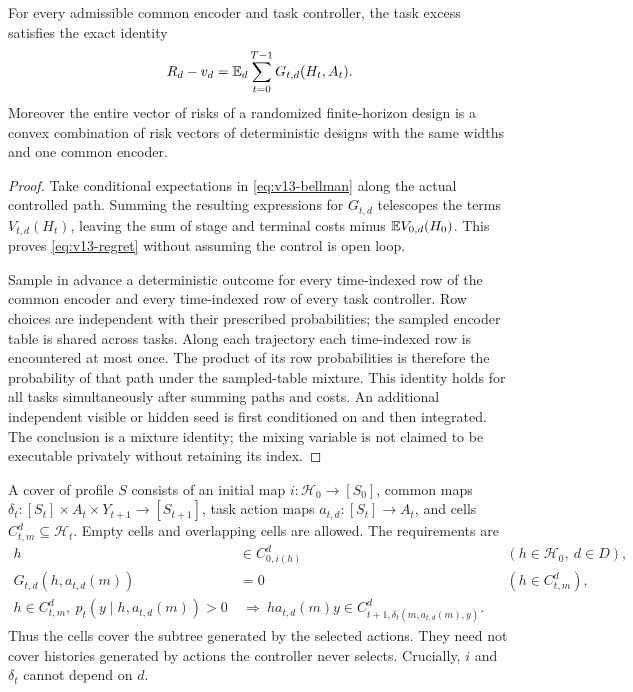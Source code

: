\begin{lemma}\label{lem:v13-regret}
For every admissible common encoder and task controller, the task excess
satisfies the exact identity
\begin{equation}\label{eq:v13-regret}
 R_d-v_d=\mathbb E_d\sum_{t=0}^{T-1}G_{t,d}(H_t,A_t).
\end{equation}
Moreover the entire vector of risks of a randomized finite-horizon
design is a convex combination of risk vectors of deterministic designs
with the same widths and one common encoder.
\end{lemma}
\begin{proof}
Take conditional expectations in \eqref{eq:v13-bellman} along the actual
controlled path. Summing the resulting expressions for $G_{t,d}$
telescopes the terms $V_{t,d}(H_t)$, leaving the sum of stage and terminal
costs minus $\mathbb E V_{0,d}(H_0)$. This proves \eqref{eq:v13-regret} without
assuming the control is open loop.

Sample in advance a deterministic outcome for every time-indexed row
of the common encoder and every time-indexed row of every task
controller. Row choices are independent with their prescribed
probabilities; the sampled encoder table is shared across tasks.
Along each trajectory each time-indexed row is encountered at most
once. The product of its row probabilities is therefore the probability
of that path under the sampled-table mixture. This identity holds for
all tasks simultaneously after summing paths and costs. An additional
independent visible or hidden seed is first conditioned on and then
integrated. The conclusion is a mixture identity; the mixing variable
is not claimed to be executable privately without retaining its index.
\end{proof}

\begin{definition}\label{def:v13-cover}
A cover of profile $S$ consists of an initial map
$i:\mathcal H_0\to[S_0]$, common maps
$\delta_t:[S_t]\times A_t\times Y_{t+1}\to[S_{t+1}]$,
task action maps $a_{t,d}:[S_t]\to A_t$, and cells
$C_{t,m}^d\subseteq\mathcal H_t$. Empty cells and overlapping cells are
allowed. The requirements are
\begin{align}
 h&\in C_{0,i(h)}^d&& (h\in\mathcal H_0,\ d\in D),\label{eq:v13-cover}\\
 G_{t,d}(h,a_{t,d}(m))&=0&& (h\in C_{t,m}^d),\nonumber\\
 h\in C_{t,m}^d,\ p_t(y\mid h,a_{t,d}(m))>0
 &\ \Longrightarrow\
 ha_{t,d}(m)y\in C_{t+1,\delta_t(m,a_{t,d}(m),y)}^d.\nonumber
\end{align}
Thus the cells cover the subtree generated by the selected actions.
They need not cover histories generated by actions the controller never
selects. Crucially, $i$ and $\delta_t$ cannot depend on $d$.
\end{definition}

